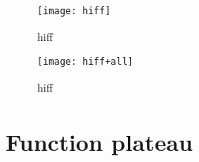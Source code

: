 \begin{center}
\begin{figure}[h]
\centering
\texttt{[image: hiff]}
\caption{hiff}
\end{figure}
\end{center}

\begin{center}
\begin{figure}[h]
\centering
\texttt{[image: hiff+all]}
\caption{hiff}
\end{figure}
\end{center}

\newpage

\section{Function plateau}
